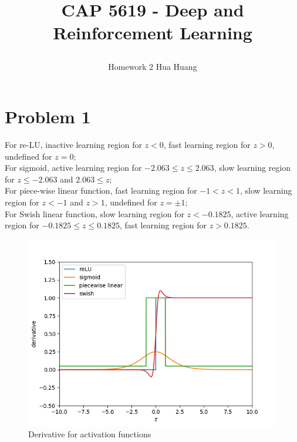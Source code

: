 \documentclass[12pt]{article}
\begin{document}
\title*{\centerline{\huge{CAP 5619 \-- Deep and Reinforcement Learning}}}
\author*{\centerline{Homework 2 Hua Huang}}%

\section{Problem 1}
For re\--LU, inactive learning region for $z<0$, fast learning region
for $ z>0$, undefined for $z=0$;\\
For sigmoid, active learning region for $-2.063\leq z \leq 2.063$,
slow learning region for $z \leq -2.063$ and $2.063\leq z$;\\
For piece\--wise linear function, fast learning region for 
$-1< z < 1$, slow learning region for $z<-1$ and $z>1$, undefined for
$z=\pm 1$;\\
For Swish linear function, slow learning region for $z<-0.1825$,
active learning region for $-0.1825 \leq z \leq 0.1825$, fast learning
region for $z>0.1825$.
\begin{figure}[h]
    \centering
    \includegraphics [scale=0.5]{prob1.png}
    \caption {Derivative for activation functions}
\end{figure}
\end{document}
